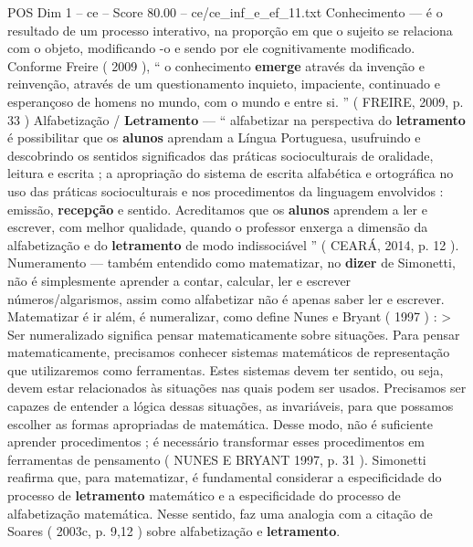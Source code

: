\begin{textsample}{POS Dim 1 – ce – Score 80.00 – ce/ce\_inf\_e\_ef\_11.txt}
Conhecimento — é o resultado de um processo interativo, na proporção em que o sujeito se relaciona com o objeto, modificando -o e sendo por ele cognitivamente modificado.
Conforme Freire ( 2009 ), “ o conhecimento \textbf{emerge} através da invenção e reinvenção, através de um questionamento inquieto, impaciente, continuado e esperançoso de homens no mundo, com o mundo e entre si. ” ( FREIRE, 2009, p. 33 ) Alfabetização / \textbf{Letramento} — “ alfabetizar na perspectiva do \textbf{letramento} é possibilitar que os \textbf{alunos} aprendam a Língua Portuguesa, usufruindo e descobrindo os sentidos significados das práticas socioculturais de oralidade, leitura e escrita ; a apropriação do sistema de escrita alfabética e ortográfica no uso das práticas socioculturais e nos procedimentos da linguagem envolvidos : emissão, \textbf{recepção} e sentido.
Acreditamos que os \textbf{alunos} aprendem a ler e escrever, com melhor qualidade, quando o professor enxerga a dimensão da alfabetização e do \textbf{letramento} de modo indissociável ” ( CEARÁ, 2014, p. 12 ).
Numeramento — também entendido como matematizar, no \textbf{dizer} de Simonetti, não é simplesmente aprender a contar, calcular, ler e escrever números/algarismos, assim como alfabetizar não é apenas saber ler e escrever.
Matematizar é ir além, é numeralizar, como define Nunes e Bryant ( 1997 ) : > Ser numeralizado significa pensar matematicamente sobre situações.
Para pensar matematicamente, precisamos conhecer sistemas matemáticos de representação que utilizaremos como ferramentas.
Estes sistemas devem ter sentido, ou seja, devem estar relacionados às situações nas quais podem ser usados.
Precisamos ser capazes de entender a lógica dessas situações, as invariáveis, para que possamos escolher as formas apropriadas de matemática.
Desse modo, não é suficiente aprender procedimentos ; é necessário transformar esses procedimentos em ferramentas de pensamento ( NUNES E BRYANT 1997, p. 31 ).
Simonetti reafirma que, para matematizar, é fundamental considerar a especificidade do processo de \textbf{letramento} matemático e a especificidade do processo de alfabetização matemática.
Nesse sentido, faz uma analogia com a citação de Soares ( 2003c, p. 9,12 ) sobre alfabetização e \textbf{letramento}.

\end{textsample}
